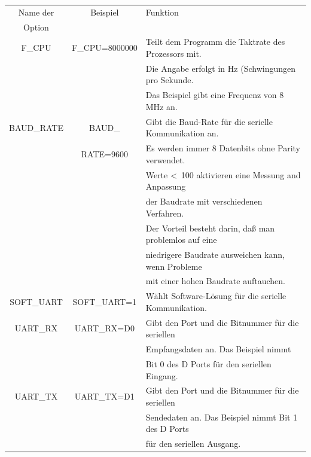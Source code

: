 \begin{table}[H]
  \begin{center}
    \begin{tabular}{| c | c | l |}
    \hline
   Name der        & Beispiel       & Funktion                                            \\
    Option         &                &                                                     \\
    \hline
    \hline
    F\_CPU         & F\_CPU=8000000 & Teilt dem Programm die Taktrate des Prozessors mit. \\
                   &                & Die Angabe erfolgt in Hz (Schwingungen pro Sekunde. \\
                   &                & Das Beispiel gibt eine Frequenz von 8 MHz an. \\
    \hline
    BAUD\_RATE     & BAUD\_         & Gibt die Baud-Rate für die serielle Kommunikation an. \\
                   &  RATE=9600     & Es werden immer 8 Datenbits ohne Parity verwendet. \\
                   &                & Werte \textless~100 aktivieren eine Messung and Anpassung \\
                   &                & der Baudrate mit verschiedenen Verfahren.  \\
		   &                & Der Vorteil besteht darin, daß man problemlos auf eine \\
		   &                & niedrigere Baudrate ausweichen kann, wenn Probleme \\
		   &                & mit einer hohen Baudrate auftauchen. \\
    \hline
    SOFT\_UART     & SOFT\_UART=1   & Wählt Software-Lösung für die serielle Kommunikation. \\
    \hline
    UART\_RX        & UART\_RX=D0   & Gibt den Port und die Bitnummer für die seriellen  \\
                   &                & Empfangsdaten an. Das Beispiel nimmt               \\
                   &                & Bit 0 des D Ports für den seriellen Eingang.\\
    \hline
    UART\_TX        & UART\_TX=D1   & Gibt den Port und die Bitnummer für die seriellen  \\
                   &                & Sendedaten an.  Das Beispiel nimmt Bit 1 des D Ports \\
                   &                & für den seriellen Ausgang.\\

\end{tabular}
\end{center}
\end{table}
